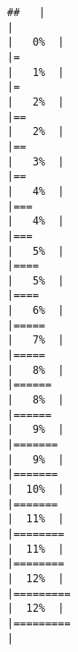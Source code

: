\documentclass[
]{book}
\begin{document}
\begin{verbatim}
##   |                                                                              |                                                                      |   0%  |                                                                              |=                                                                     |   1%  |                                                                              |=                                                                     |   2%  |                                                                              |==                                                                    |   2%  |                                                                              |==                                                                    |   3%  |                                                                              |==                                                                    |   4%  |                                                                              |===                                                                   |   4%  |                                                                              |===                                                                   |   5%  |                                                                              |====                                                                  |   5%  |                                                                              |====                                                                  |   6%  |                                                                              |=====                                                                 |   7%  |                                                                              |=====                                                                 |   8%  |                                                                              |======                                                                |   8%  |                                                                              |======                                                                |   9%  |                                                                              |=======                                                               |   9%  |                                                                              |=======                                                               |  10%  |                                                                              |=======                                                               |  11%  |                                                                              |========                                                              |  11%  |                                                                              |========                                                              |  12%  |                                                                              |=========                                                             |  12%  |                                                                              |=========                                                             |  
\end{verbatim}
\end{document}
